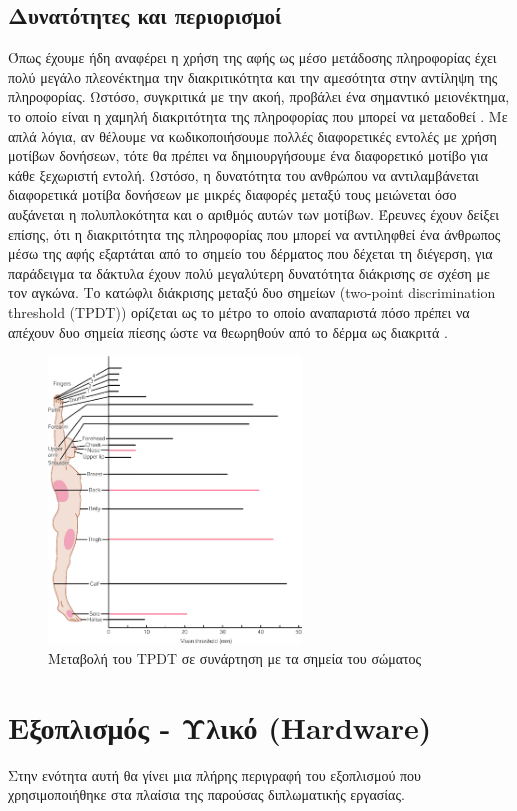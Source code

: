 \subsection{Δυνατότητες και περιορισμοί}
Όπως έχουμε ήδη αναφέρει η χρήση της αφής ως μέσο μετάδοσης πληροφορίας έχει πολύ μεγάλο πλεονέκτημα την διακριτικότητα και την αμεσότητα στην αντίληψη της πληροφορίας. Ωστόσο, συγκριτικά με την ακοή, προβάλει ένα σημαντικό μειονέκτημα, το οποίο είναι η χαμηλή διακριτότητα της πληροφορίας που μπορεί να μεταδοθεί \cite{kaczmarek1991electrotactile}. Με απλά λόγια, αν θέλουμε να κωδικοποιήσουμε πολλές διαφορετικές εντολές με χρήση μοτίβων δονήσεων, τότε θα πρέπει να δημιουργήσουμε ένα διαφορετικό μοτίβο για κάθε ξεχωριστή εντολή. Ωστόσο, η δυνατότητα του ανθρώπου να αντιλαμβάνεται διαφορετικά μοτίβα δονήσεων με μικρές διαφορές μεταξύ τους μειώνεται όσο αυξάνεται η πολυπλοκότητα και ο αριθμός αυτών των μοτίβων. Έρευνες έχουν δείξει επίσης, ότι η διακριτότητα της πληροφορίας που μπορεί να αντιληφθεί ένα άνθρωπος μέσω της αφής εξαρτάται από το σημείο του δέρματος που δέχεται τη διέγερση, για παράδειγμα τα δάκτυλα έχουν πολύ μεγαλύτερη δυνατότητα διάκρισης σε σχέση με τον αγκώνα. Το κατώφλι διάκρισης μεταξύ δυο σημείων (two-point discrimination threshold (TPDT)) ορίζεται ως το μέτρο το οποίο αναπαριστά πόσο πρέπει να απέχουν δυο σημεία πίεσης ώστε να θεωρηθούν από το δέρμα ως διακριτά \cite{koo2016two}.
\begin{figure}[H]
    \centering
    \includegraphics[width=0.6\textwidth]{images/TPDT.png}
    \caption{Μεταβολή του TPDT σε συνάρτηση με τα σημεία του σώματος \cite{weinstein1968intensive}}
    \label{fig:TPDT}
\end{figure}
\newpage
\section{Εξοπλισμός - Υλικό (Hardware)}
Στην ενότητα αυτή θα γίνει μια πλήρης περιγραφή του εξοπλισμού που χρησιμοποιήθηκε στα πλαίσια της παρούσας διπλωματικής εργασίας.

